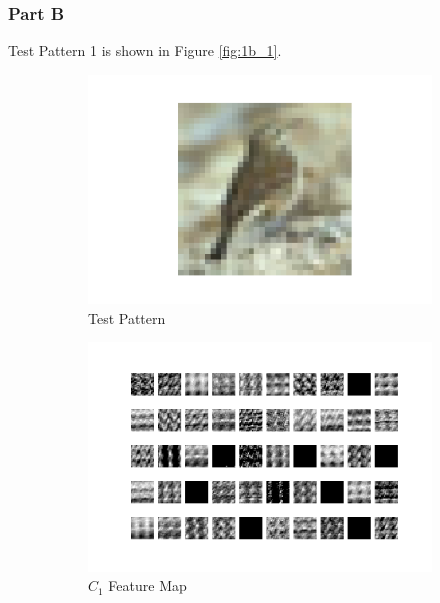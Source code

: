 \subsubsection{Part B}
Test Pattern 1 is shown in Figure \ref{fig:1b_1}.
\begin{figure}[H]
    \begin{subfigure}{0.5\textwidth}
        \centering
        \includegraphics[width=1\linewidth]{assets/plots1/q1a_test_pattern_0.png}
        \caption{Test Pattern}
    \end{subfigure}
    \begin{subfigure}{0.5\textwidth}
        \centering
        \includegraphics[width=1\linewidth]{assets/plots1/q1a_conv1_0.png}
        \caption{$\textit{C}_1$ Feature Map}
    \end{subfigure}
    \begin{subfigure}{0.5\textwidth}
        \centering

\end{subfigure}
\end{figure}
